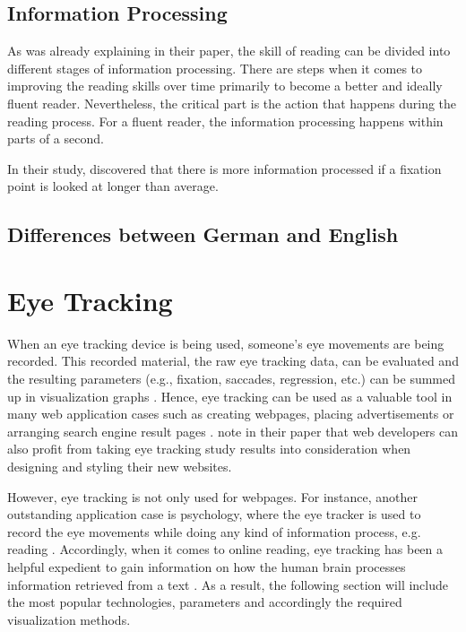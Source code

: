 \subsection{Information Processing}
\label{subsection:InformationProcessing}

As \textcite{laberge1974toward} was already explaining in their paper, the skill of reading can be divided into different stages of information processing. There are steps when it comes to improving the reading skills over time primarily to become a better and ideally fluent reader. Nevertheless, the critical part is the action that happens during the reading process. For a fluent reader, the information processing happens within parts of a second.


In their study, \textcite{buscher2009you} discovered that there is more information processed if a fixation point is looked at longer than average.

\subsection{Differences between German and English}
\label{subsection:Differences}

\section{Eye Tracking}
\label{section:EyeTracking}
When an eye tracking device is being used, someone's eye movements are being recorded. This recorded material, the raw eye tracking data, can be evaluated and the resulting parameters (e.g., fixation, saccades, regression, etc.) can be summed up in visualization graphs \autocite[]{goldberg2002eye, poole2006eye, beymer2007eye}. Hence, eye tracking can be used as a valuable tool in many web application cases such as creating webpages, placing advertisements or arranging search engine result pages \autocite{buscher2009you, liu2015influence}. \textcite[]{buscher2009you} note in their paper that web developers can also profit from taking eye tracking study results into consideration when designing and styling their new websites. 

However, eye tracking is not only used for webpages. For instance, another outstanding application case is psychology, where the eye tracker is used to record the eye movements while doing any kind of information process, e.g. reading \autocite{schiessl2003eye}.
Accordingly, when it comes to online reading, eye tracking has been a helpful expedient to gain information on how the human brain processes information retrieved from a text \autocite[]{schiessl2003eye}.
As a result, the following section will include the most popular technologies, parameters and accordingly the required visualization methods. 

